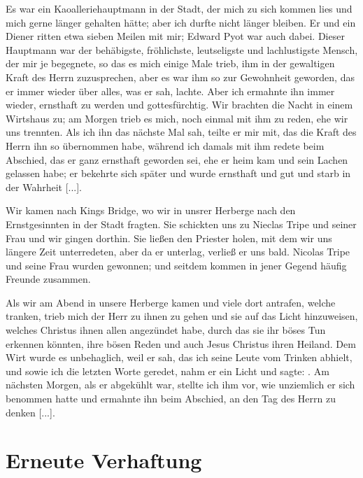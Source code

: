 Es war ein Kaoalleriehauptmann in der Stadt, der mich zu sich
kommen lies und mich gerne länger gehalten hätte; aber ich
durfte nicht länger bleiben. Er und ein Diener ritten etwa
sieben Meilen mit mir; Edward Pyot war 
auch dabei. Dieser
Hauptmann war der behäbigste, fröhlichste, leutseligste und 
lachlustigste Mensch, der mir je 
begegnete, so das es mich einige Male
trieb, ihm in der gewaltigen Kraft des Herrn zuzusprechen, aber
es war ihm so zur Gewohnheit geworden, das er immer wieder
über alles, was er sah, lachte. Aber ich ermahnte ihn immer
wieder, ernsthaft zu werden und gottesfürchtig. Wir brachten die
Nacht in einem Wirtshaus zu; am Morgen trieb es mich, noch
einmal mit ihm zu reden, ehe wir uns trennten. Als ich ihn
das nächste Mal sah, teilte er mir mit, das die Kraft des Herrn
ihn so übernommen habe, während ich damals mit ihm redete
beim Abschied, das er ganz ernsthaft geworden sei, ehe er heim
kam und sein Lachen gelassen habe; er bekehrte sich später und
wurde ernsthaft und gut und starb in der Wahrheit [...].


Wir kamen nach Kings Bridge, wo wir in unsrer Herberge
nach den Ernstgesinnten in der Stadt fragten. Sie schickten uns
zu Nieclas Tripe und seiner Frau und wir 
gingen dorthin. Sie
ließen den Priester holen, mit dem wir uns längere Zeit unterredeten,
aber da er unterlag, verließ er uns bald. Nicolas 
Tripe und
seine Frau wurden gewonnen; und seitdem kommen in jener Gegend
häufig Freunde zusammen. 


Als wir am Abend in unsere
Herberge kamen und viele dort antrafen, welche 
tranken, trieb 
mich der Herr zu ihnen zu gehen und sie auf das Licht 
hinzuweisen, welches Christus ihnen allen angezündet habe, durch das 
sie ihr böses Tun erkennen könnten, ihre bösen Reden und auch
Jesus Christus ihren Heiland. Dem Wirt wurde es unbehaglich,
weil er sah, das ich seine Leute vom Trinken abhielt, und sowie
ich die letzten Worte geredet, nahm er ein Licht und 
sagte: . Am
nächsten Morgen, als er abgekühlt war, stellte ich ihm vor, wie
unziemlich er sich benommen hatte und ermahnte ihn beim Abschied,
an den Tag des Herrn zu denken [...]. 

\section{Erneute Verhaftung}

